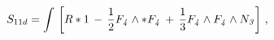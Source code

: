 \begin{equation}
S_{11d}=\int \,\left[ R *1 \, - \, {1\over 2} F_{\it 4} \wedge *
 F_{\it 4} \, + \, {1 \over 3}
F_{\it 4} \wedge F_{\it 4} \wedge N_{\it 3} \right] \,,
\end{equation}

